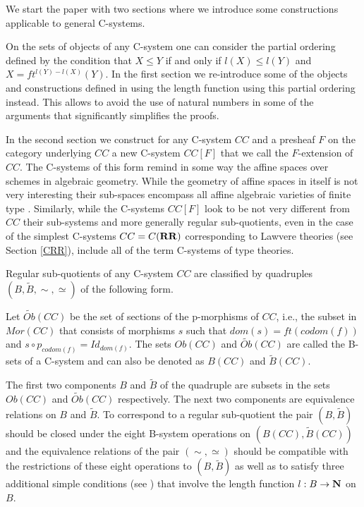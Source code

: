 \documentclass[12pt]{amsart}
\newcommand{\sr}{\rightarrow}
\newcommand{\nn}{{\bf N\rm}}
\newcommand{\nat}{\nn}
\newcommand{\wt}{\widetilde}
\newcommand{\RR}{{\bf RR}}
\begin{document}
We start the paper with two sections where we introduce some constructions applicable to general C-systems. 

On the sets of objects of any C-system one can consider the partial ordering defined by the condition that $X\le Y$ if and only if $l(X)\le l(Y)$ and $X=ft^{l(Y)-l(X)}(Y)$. In the first section we re-introduce some of the objects and constructions defined in \cite{Csubsystems} using the length function using this partial ordering instead. This allows to avoid the use of natural numbers in some of the arguments that significantly simplifies the proofs. 

In the second section we construct for any C-system $CC$ and a presheaf $F$ on the category underlying $CC$ a new C-system $CC[F]$ that we call the $F$-extension of $CC$. The C-systems of this form remind in some way the affine spaces over schemes in algebraic geometry. While the geometry of affine spaces in itself is not very interesting their sub-spaces encompass all affine algebraic varieties of finite type . Similarly, while the C-systems $CC[F]$ look to be not very different from $CC$ their sub-systems and more generally regular sub-quotients, even in the case of the simplest C-systems $CC=C(\RR)$ corresponding to Lawvere theories (see Section \ref{CRR}), include all of the term C-systems of type theories.  

Regular sub-quotients of any C-system $CC$ are classified by quadruples $(B,\wt{B}, \sim,\simeq)$ of the following form. 

Let $\wt{Ob}(CC)$ be the set of sections of the p-morphisms of $CC$, i.e., the subset in $Mor(CC)$ that consists of morphisms $s$ such that $dom(s)=ft(codom(f))$ and $s\circ p_{codom(f)}=Id_{dom(f)}$.  The sets $Ob(CC)$ and $\wt{Ob}(CC)$ are called the B-sets of a C-system and can also be denoted as $B(CC)$ and $\wt{B}(CC)$. 

The first two components $B$ and $\wt{B}$ of the quadruple are subsets in the sets $Ob(CC)$ and $\wt{Ob}(CC)$ respectively. The next two components are equivalence relations on $B$ and $\wt{B}$. To correspond to a regular sub-quotient the pair $(B,\wt{B})$ should be closed under the eight B-system operations on $(B(CC),\wt{B}(CC))$ and the equivalence relations of the pair $(\sim,\simeq)$ should be compatible with the restrictions of these eight operations to $(B,\wt{B})$ as well as to satisfy three additional simple conditions (see \cite[Proposition 5.4]{Csubsystems}) that involve the length function $l:B\sr\nat$ on $B$. 
\end{document}
